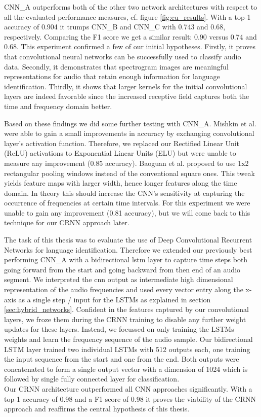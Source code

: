 CNN\_A outperforms both of the other two network architectures with respect to all the evaluated performance measures, cf. figure \ref{fig:eu_results}. With a top-1 accuracy of 0.904 it trumps CNN\_B and CNN\_C with 0.743 and 0.68, respectively. Comparing the F1 score we get a similar result: 0.90 versus 0.74 and 0.68. This experiment confirmed a few of our initial hypotheses. Firstly, it proves that convolutional neural networks can be successfully used to classify audio data. Secondly, it demonstrates that spectrogram images are meaningful representations for audio that retain enough information for language identification. Thirdly, it shows that larger kernels for the initial convolutional layers are indeed favorable since the increased receptive field captures both the time and frequency domain better. 

Based on these findings we did some further testing with CNN\_A. Mishkin et al.\cite{mishkin2016systematic} were able to gain a small improvements in accuracy by exchanging convolutional layer's activation function. Therefore, we replaced our  Rectified Linear Unit (ReLU) activations to Exponential Linear Units\cite{clevert2015fast} (ELU) but were unable to measure any improvement (0.85 accuracy). 
Baoguan et al. \cite{shi2016end} proposed to use 1x2 rectangular pooling windows instead of the conventional square ones. This tweak yields feature maps with larger width, hence longer features along the time domain. In theory this should increase the CNN's sensitivity at capturing the occurrence of frequencies at certain time intervals. For this experiment we were unable to gain any improvement (0.81 accuracy), but we will come back to this technique for our CRNN approach later.

The task of this thesis was to evaluate the use of Deep Convolutional Recurrent Networks for language identification. Therefore we extended our previously best performing CNN\_A with a bidirectional \ac{lstm} layer to capture time steps both going forward from the start and going backward from then end of an audio segment. We interpreted the \ac{cnn} output as intermediate high dimensional representation of the audio frequencies and used every vector entry along the x-axis as a single step / input for the LSTMs as explained in section \ref{sec:hybrid_networks}. Confident in the features captured by our convolutional layers, we froze them during the CRNN training to disable any further weight updates for these layers. Instead, we focussed on only training the LSTMs weights and learn the frequency sequence of the audio sample. Our bidirectional LSTM layer trained two individual LSTMs with 512 outputs each, one training the input sequence from the start and one from the end. Both outputs were concatenated to form a single output vector with a dimension of 1024 which is followed by single fully connected layer for classification.\\
Our CRNN architecture outperformed all CNN approaches significantly. With a top-1 accuracy of 0.98 and a F1 score of 0.98 it proves the viability of the CRNN approach and reaffirms the central hypothesis of this thesis.



